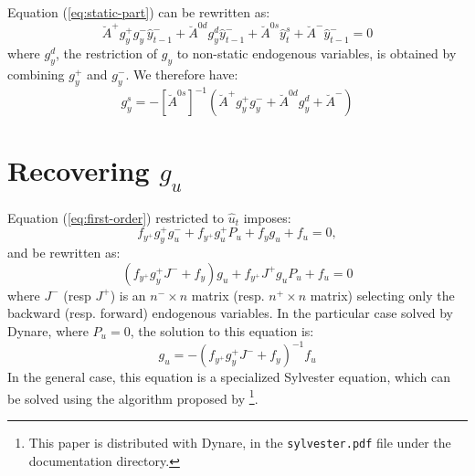 \documentclass[11pt,a4paper]{article}
\begin{document}
Equation (\ref{eq:static-part}) can be rewritten as:
\begin{equation*}
  \breve{A}^+ g^+_y g^-_y \hat{y}^-_{t-1} + \breve{A}^{0d} g^d_y \hat{y}^-_{t-1} + \breve{A}^{0s} \hat{y}^{s}_t + \breve{A}^- \hat{y}^-_{t-1} = 0
\end{equation*}
where $g^d_y$, the restriction of $g_y$ to non-static endogenous variables, is
obtained by combining $g^+_y$ and $g^-_y$. We therefore have:
\begin{equation*}
  g^s_y = -\left[\breve{A}^{0s}\right]^{-1} \left(\breve{A}^+ g^+_y g^-_y + \breve{A}^{0d} g^d_y + \breve{A}^-\right)
\end{equation*}

\section{Recovering $g_u$}
\label{sec:g-u}

Equation (\ref{eq:first-order}) restricted to $\hat{u}_t$ imposes:
\begin{equation*}
  f_{y^+} g^+_yg^-_u+ f_{y^+}g^+_u P_u + f_y g_u + f_u = 0,
\end{equation*}
and be rewritten as:
\begin{equation*}
  (f_{y^+} g^+_y J^- + f_y) g_u + f_{y^+}J^+ g_u P_u + f_u = 0
\end{equation*}
where $J^-$ (resp $J^+$) is an $n^-\times n$ matrix (resp. $n^+\times n$
matrix) selecting only the backward (resp. forward) endogenous variables.  In
the particular case solved by Dynare, where $P_u = 0$, the solution to this
equation is:
\begin{equation*}
  g_u = -(f_{y^+} g^+_y J^- + f_y)^{-1} f_u
\end{equation*}
In the general case, this equation is a specialized Sylvester equation, which
can be solved using the algorithm proposed by
\citet{kamenik:2003}\footnote{This paper is distributed with Dynare, in the
  \texttt{sylvester.pdf} file under the documentation directory.}.



\end{document}
